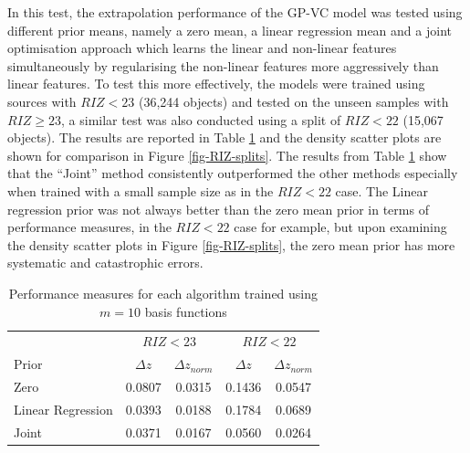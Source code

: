 \documentclass[useAMS,usenatbib,fleqn]{mn2e}
\begin{document}
In this test, the extrapolation performance of the GP-VC model was tested using different prior means, namely a zero mean, a linear regression mean and a joint optimisation approach which learns the linear and non-linear features simultaneously by regularising the non-linear features more aggressively than linear features. To test this more effectively,  the models were trained using sources with $RIZ<23$ (36,244 objects) and tested on the unseen samples with $RIZ\ge23$, a similar test was also conducted using a split of $RIZ<22$ (15,067 objects). The results are reported in Table \ref{table-RIZ-splits} and the density scatter plots are shown for comparison in Figure \ref{fig-RIZ-splits}. The results from Table \ref{table-RIZ-splits} show that the ``Joint'' method consistently outperformed the other methods especially when trained with a small sample size as in the $RIZ<22$ case. The Linear regression prior was not always better than the zero mean prior in terms of performance measures, in the $RIZ<22$ case for example, but upon examining the density scatter plots in Figure \ref{fig-RIZ-splits}, the zero mean prior has more systematic and catastrophic errors.

 \begin{table}
\caption{Performance measures for each algorithm trained using $m=10$ basis functions}
\begin{center}
  \begin{tabular}{| l | c | c | c | c | }
  								& 	\multicolumn{2}{|c|}{$RIZ<23$}		& 	\multicolumn{2}{c}{$RIZ<22$} \\ \cline{2-5}
     	Prior						&	$\Delta z$	&	$\Delta z_{norm}$	&	$\Delta z$	&	$\Delta z_{norm}$	\\	\hline
	Zero						&	0.0807		&	0.0315				&	0.1436		&	0.0547					\\	 
	Linear Regression		&	0.0393		&	0.0188				&	0.1784		&	0.0689					\\ 
	Joint						&	0.0371		&	0.0167				&	0.0560		&	0.0264					\\	\hline
  \end{tabular}
  \label{table-RIZ-splits}
\end{center}
\end{table}
\end{document}
